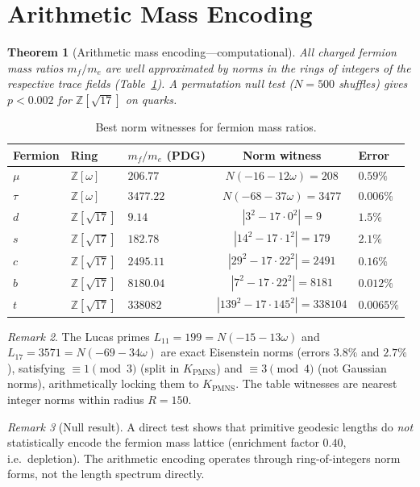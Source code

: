 \documentclass[11pt,a4paper]{article}
\newtheorem{theorem}{Theorem}
\theoremstyle{definition}
\theoremstyle{remark}
\newtheorem{remark}[theorem]{Remark}
\newcommand{\KPMNS}{K_{\mathrm{PMNS}}}
\newcommand{\Zom}{\mathbb{Z}[\omega]}
\newcommand{\Zsev}{\mathbb{Z}[\sqrt{17}]}
\begin{document}
\section{Arithmetic Mass Encoding}
\label{sec:mass}

\begin{theorem}[Arithmetic mass encoding---computational]
\label{thm:mass}
All charged fermion mass ratios $m_f/m_e$ are well approximated
by norms in the rings of integers of the respective trace fields
(Table~\ref{tab:witnesses}).
A permutation null test ($N=500$ shuffles) gives $p<0.002$
for $\Zsev$ on quarks.
\end{theorem}

\begin{table}[htbp]
\centering
\caption{Best norm witnesses for fermion mass ratios.}
\label{tab:witnesses}
\begin{tabular}{lllcl}
\toprule
Fermion & Ring & $m_f/m_e$ (PDG) & Norm witness & Error \\
\midrule
$\mu$  & $\Zom$ & $206.77$  & $N(-16-12\omega)=208$      & $0.59\%$ \\
$\tau$ & $\Zom$ & $3477.22$ & $N(-68-37\omega)=3477$     & $0.006\%$ \\
\midrule
$d$ & $\Zsev$ & $9.14$    & $|3^2-17\cdot0^2|=9$        & $1.5\%$ \\
$s$ & $\Zsev$ & $182.78$  & $|14^2-17\cdot1^2|=179$     & $2.1\%$ \\
$c$ & $\Zsev$ & $2495.11$ & $|29^2-17\cdot22^2|=2491$   & $0.16\%$ \\
$b$ & $\Zsev$ & $8180.04$ & $|7^2-17\cdot22^2|=8181$    & $0.012\%$ \\
$t$ & $\Zsev$ & $338082$  & $|139^2-17\cdot145^2|=338104$ & $0.0065\%$ \\
\bottomrule
\end{tabular}
\end{table}

\begin{remark}
The Lucas primes $L_{11}=199=N(-15-13\omega)$ and
$L_{17}=3571=N(-69-34\omega)$ are exact Eisenstein norms
(errors $3.8\%$ and $2.7\%$), satisfying $\equiv1\pmod3$
(split in $\KPMNS$) and $\equiv3\pmod4$ (not Gaussian norms),
arithmetically locking them to $\KPMNS$.
The table witnesses are nearest integer norms within radius $R=150$.
\end{remark}

\begin{remark}[Null result]
A direct test shows that primitive geodesic lengths do
\emph{not} statistically encode the fermion mass lattice
(enrichment factor $0.40$, i.e.\ depletion).
The arithmetic encoding operates through ring-of-integers norm forms,
not the length spectrum directly.
\end{remark}
\end{document}
